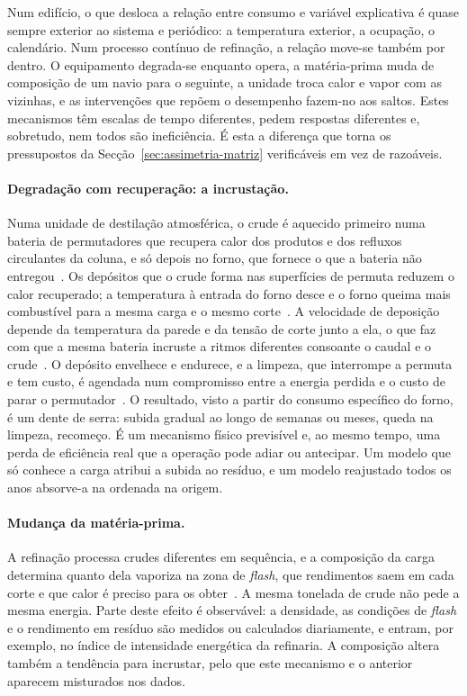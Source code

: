 Num edifício, o que desloca a relação entre consumo e variável explicativa
é quase sempre exterior ao sistema e periódico: a temperatura exterior, a
ocupação, o calendário. Num processo contínuo de refinação, a relação move-se
também por dentro. O equipamento degrada-se enquanto opera, a matéria-prima
muda de composição de um navio para o seguinte, a unidade troca calor e
vapor com as vizinhas, e as intervenções que repõem o desempenho fazem-no aos
saltos. Estes mecanismos têm escalas de tempo diferentes, pedem respostas
diferentes e, sobretudo, nem todos são ineficiência. É esta a diferença que
torna os pressupostos da Secção~\ref{sec:assimetria-matriz} verificáveis em
vez de razoáveis.

\paragraph{Degradação com recuperação: a incrustação.} Numa unidade de
destilação atmosférica, o crude é aquecido primeiro numa bateria de
permutadores que recupera calor dos produtos e dos refluxos circulantes da
coluna, e só depois no forno, que fornece o que a bateria não entregou~\cite{Gary2007}.
Os depósitos que o crude forma nas superfícies de permuta reduzem o calor
recuperado; a temperatura à entrada do forno desce e o forno queima mais
combustível para a mesma carga e o mesmo corte~\cite{ColettiMacchietto2011}.
A velocidade de deposição depende da temperatura da parede e da tensão de
corte junto a ela, o que faz com que a mesma bateria incruste a ritmos
diferentes consoante o caudal e o crude~\cite{Wilson2017}. O depósito envelhece e
endurece, e a limpeza, que interrompe a permuta e tem custo, é agendada num
compromisso entre a energia perdida e o custo de parar o
permutador~\cite{Ishiyama2011}. O resultado, visto a partir do consumo
específico do forno, é um dente de serra: subida gradual ao longo de semanas
ou meses, queda na limpeza, recomeço. É um mecanismo físico previsível e, ao
mesmo tempo, uma perda de eficiência real que a operação pode adiar ou
antecipar. Um modelo que só conhece a carga atribui a subida ao resíduo, e um
modelo reajustado todos os anos absorve-a na ordenada na origem.

\paragraph{Mudança da matéria-prima.} A refinação processa crudes diferentes
em sequência, e a composição da carga determina quanto dela vaporiza na zona
de \emph{flash}, que rendimentos saem em cada corte e que calor é preciso
para os obter~\cite{Gary2007}. A mesma tonelada de crude não pede a mesma
energia. Parte deste efeito é observável: a densidade, as condições de
\emph{flash} e o rendimento em resíduo são medidos ou calculados
diariamente, e entram, por exemplo, no índice de intensidade energética da
refinaria. A composição altera também a tendência para incrustar, pelo que
este mecanismo e o anterior aparecem misturados nos dados.

